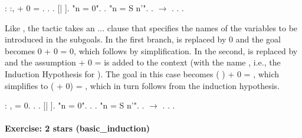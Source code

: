 \documentclass[12pt]{report}
\begin{document}
\begin{coqdoccode}
\coqdocemptyline
\coqdocnoindent
{}  : \coqdockw{\ensuremath{\forall}} :,  + 0 = .\coqdoceol
\coqdocnoindent
{}.\coqdoceol
\coqdocindent{1.00em}
 .    [| ].\coqdoceol
\coqdocindent{1.00em}
 "n = 0". .\coqdoceol
\coqdocindent{1.00em}
 "n = S n'". .  \ensuremath{\rightarrow} . . .\coqdoceol
\coqdocemptyline
\end{coqdoccode}
Like , the  tactic takes an ...
    clause that specifies the names of the variables to be introduced
    in the subgoals.  In the first branch,  is replaced by 0 and
    the goal becomes 0 + 0 = 0, which follows by simplification.  In
    the second,  is replaced by   and the assumption  + 0 =
     is added to the context (with the name , i.e., the
    Induction Hypothesis for ).  The goal in this case becomes (
    ) + 0 =  , which simplifies to  ( + 0) =  , which in
    turn follows from the induction hypothesis. \begin{coqdoccode}
\coqdocemptyline
\coqdocnoindent
{}  : \coqdockw{\ensuremath{\forall}} ,\coqdoceol
\coqdocindent{1.00em}
   = 0.\coqdoceol
\coqdocnoindent
{}.\coqdoceol
\coqdocindent{1.00em}
 .    [| ].\coqdoceol
\coqdocindent{1.00em}
 "n = 0".\coqdoceol
\coqdocindent{2.00em}
. .\coqdoceol
\coqdocindent{1.00em}
 "n = S n'".\coqdoceol
\coqdocindent{2.00em}
.  \ensuremath{\rightarrow} . . .\coqdoceol
\coqdocemptyline
\end{coqdoccode}
\paragraph{Exercise: 2 stars (basic\_induction)}
\end{document}
